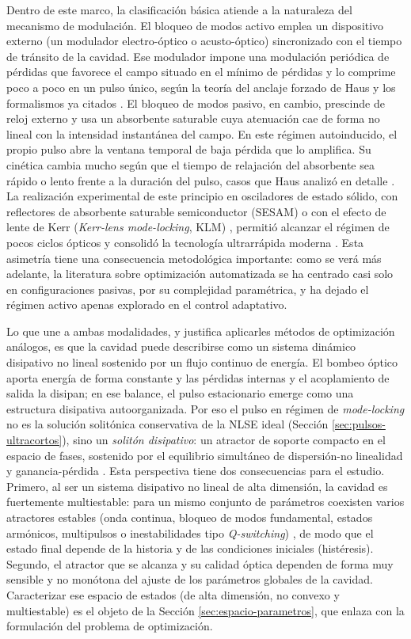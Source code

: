 Dentro de este marco, la clasificación básica atiende a la naturaleza del mecanismo de modulación. El bloqueo de modos activo emplea un dispositivo externo (un modulador electro-óptico o acusto-óptico) sincronizado con el tiempo de tránsito de la cavidad. Ese modulador impone una modulación periódica de pérdidas que favorece el campo situado en el mínimo de pérdidas y lo comprime poco a poco en un pulso único, según la teoría del anclaje forzado de Haus \cite{Haus1975forced} y los formalismos ya citados \cite{KuizengaSiegman1970}. El bloqueo de modos pasivo, en cambio, prescinde de reloj externo y usa un absorbente saturable cuya atenuación cae de forma no lineal con la intensidad instantánea del campo. En este régimen autoinducido, el propio pulso abre la ventana temporal de baja pérdida que lo amplifica. Su cinética cambia mucho según que el tiempo de relajación del absorbente sea rápido o lento frente a la duración del pulso, casos que Haus analizó en detalle \cite{Haus1975fast,Haus2000}. La realización experimental de este principio en osciladores de estado sólido, con reflectores de absorbente saturable semiconductor (SESAM) \cite{Keller1996} o con el efecto de lente de Kerr (\emph{Kerr-lens mode-locking}, KLM) \cite{Krausz1992}, permitió alcanzar el régimen de pocos ciclos ópticos y consolidó la tecnología ultrarrápida moderna \cite{Keller2003,Keller2022}. Esta asimetría tiene una consecuencia metodológica importante: como se verá más adelante, la literatura sobre optimización automatizada se ha centrado casi solo en configuraciones pasivas, por su complejidad paramétrica, y ha dejado el régimen activo apenas explorado en el control adaptativo.

Lo que une a ambas modalidades, y justifica aplicarles métodos de optimización análogos, es que la cavidad puede describirse como un sistema dinámico disipativo no lineal sostenido por un flujo continuo de energía. El bombeo óptico aporta energía de forma constante y las pérdidas internas y el acoplamiento de salida la disipan; en ese balance, el pulso estacionario emerge como una estructura disipativa autoorganizada. Por eso el pulso en régimen de \emph{mode-locking} no es la solución solitónica conservativa de la NLSE ideal (Sección \ref{sec:pulsos-ultracortos}), sino un \emph{solitón disipativo}: un atractor de soporte compacto en el espacio de fases, sostenido por el equilibrio simultáneo de dispersión-no linealidad y ganancia-pérdida \cite{GreluAkhmediev2012}. Esta perspectiva tiene dos consecuencias para el estudio. Primero, al ser un sistema disipativo no lineal de alta dimensión, la cavidad es fuertemente multiestable: para un mismo conjunto de parámetros coexisten varios atractores estables (onda continua, bloqueo de modos fundamental, estados armónicos, multipulsos o inestabilidades tipo \emph{Q-switching}) \cite{GreluAkhmediev2012,Kokhanovskiy2024}, de modo que el estado final depende de la historia y de las condiciones iniciales (histéresis). Segundo, el atractor que se alcanza y su calidad óptica dependen de forma muy sensible y no monótona del ajuste de los parámetros globales de la cavidad. Caracterizar ese espacio de estados (de alta dimensión, no convexo y multiestable) es el objeto de la Sección \ref{sec:espacio-parametros}, que enlaza con la formulación del problema de optimización.

